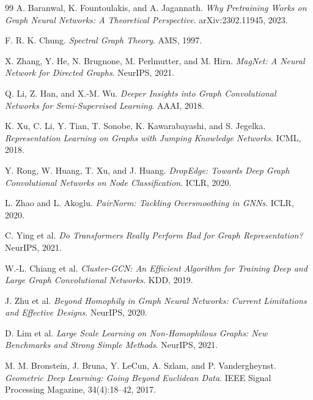 \begin{notechapter}
\begin{thebibliography}{99}
A. Baranwal, K. Fountoulakis, and A. Jagannath.
\textit{Why Pretraining Works on Graph Neural Networks: A Theoretical Perspective}.
arXiv:2302.11945, 2023.

F. R. K. Chung.
\textit{Spectral Graph Theory}.
AMS, 1997.

X. Zhang, Y. He, N. Brugnone, M. Perlmutter, and M. Hirn.
\textit{MagNet: A Neural Network for Directed Graphs}.
NeurIPS, 2021.

Q. Li, Z. Han, and X.-M. Wu.
\textit{Deeper Insights into Graph Convolutional Networks for Semi-Supervised
  Learning}.
AAAI, 2018.

K. Xu, C. Li, Y. Tian, T. Sonobe, K. Kawarabayashi, and S. Jegelka.
\textit{Representation Learning on Graphs with Jumping Knowledge Networks}.
ICML, 2018.

Y. Rong, W. Huang, T. Xu, and J. Huang.
\textit{DropEdge: Towards Deep Graph Convolutional Networks on Node
  Classification}.
ICLR, 2020.

L. Zhao and L. Akoglu.
\textit{PairNorm: Tackling Oversmoothing in GNNs}.
ICLR, 2020.

C. Ying et al.
\textit{Do Transformers Really Perform Bad for Graph Representation?}
NeurIPS, 2021.

W.-L. Chiang et al.
\textit{Cluster-GCN: An Efficient Algorithm for Training Deep and Large Graph
  Convolutional Networks}.
KDD, 2019.

J. Zhu et al.
\textit{Beyond Homophily in Graph Neural Networks: Current Limitations and
  Effective Designs}.
NeurIPS, 2020.

D. Lim et al.
\textit{Large Scale Learning on Non-Homophilous Graphs: New Benchmarks and
  Strong Simple Methods}.
NeurIPS, 2021.

M. M. Bronstein, J. Bruna, Y. LeCun, A. Szlam, and P. Vandergheynst.
\textit{Geometric Deep Learning: Going Beyond Euclidean Data}.
IEEE Signal Processing Magazine, 34(4):18--42, 2017.

\end{thebibliography}
\end{notechapter}
